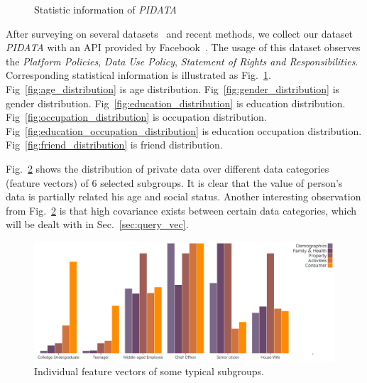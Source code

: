 \documentclass{mcmthesis}
\begin{document}
\begin{figure}[!htbp]
{        \label{fig:education_occupation_distribution}
    }
    \caption{Statistic information of \emph{PIDATA}}
    \label{fig:population_dataset}
\end{figure}

After surveying on several datasets~\cite{traud2011comparing,schwartz2013personality,pak2010twitter} and recent methods, we collect our dataset \emph{PIDATA} with an API provided by Facebook~\cite{graham2008facebook}. The usage of this dataset observes the \emph{Platform Policies}, \emph{Data Use Policy}, \emph{Statement of Rights and Responsibilities}. Corresponding statistical information is illustrated as Fig.~\ref{fig:population_dataset}. Fig~\ref{fig:age_distribution} is age distribution. Fig~\ref{fig:gender_distribution} is gender distribution. Fig~\ref{fig:education_distribution} is education distribution. Fig~\ref{fig:occupation_distribution} is occupation distribution. Fig~\ref{fig:education_occupation_distribution} is education occupation distribution. Fig~\ref{fig:friend_distribution} is friend distribution.



Fig.~\ref{fig:fvs} shows the distribution of private data over different data categories (feature vectors) of 6 selected subgroups. It is clear that the value of person's data is partially related his age and social status. Another interesting observation from Fig.~\ref{fig:fvs} is that high covariance exists between certain data categories, which will be dealt with in Sec.~\ref{sec:query_vec}.

\begin{figure}[htbp]
\begin{center}
\includegraphics[width=0.85\linewidth]{fig/bars6.png}
\caption{Individual feature vectors of some typical subgroups.}
\label{fig:fvs}
\end{center}
\end{figure}
\end{document}
